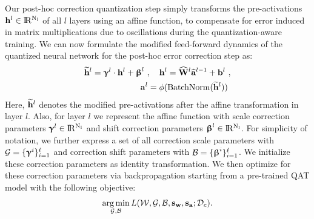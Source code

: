 Our post-hoc correction quantization step simply transforms the pre-activations ${\mathbf{h}}^l\in\rm I\!R^{N_l}$ of all $l$ layers using an affine function, to compensate for error induced in matrix multiplications due to oscillations during the quantization-aware training. We can now formulate the modified feed-forward dynamics of the quantized neural network for the post-hoc error correction step as:
\begin{align}
\label{eq:forward-qat-correction}
 \vect{h}^l = \bngamma^l \cdot \rvh^l  + \bnbeta^l\  ,\quad \rvh^l = \widehat\rmW^l\widehat\rva^{l-1} + \rvb^l\ , \\
 \rva^l = \phi(\BatchNorm(\vect{h}^l))\ 
\end{align}
Here, $\mathbf{\widetilde{h}}^l$ denotes the modified pre-activations after the affine transformation in layer $l$. Also, for layer $l$ we represent the affine function with scale correction parameters $\boldsymbol{\upgamma}^l\in\rm I\!R^{N_l}$ and shift correction parameters $\boldsymbol{\upbeta}^l\in\rm I\!R^{N_l}$. For simplicity of notation, we further express a set of all correction scale parameters with $\mathcal{G} = \{\boldsymbol{\upgamma}^i\}_{i=1}^\ell$ and correction shift parameters with $\mathcal{B} = \{\boldsymbol{\upbeta}^i\}_{i=1}^\ell$. We initialize these correction parameters as identity transformation. We then optimize for these correction parameters via backpropagation starting from a pre-trained QAT model with the following objective:
\begin{equation}\label{eq:qat-corr-nn}
\operatorname*{arg\,min}_{\mathcal{G},\mathcal{B}}L(\mathcal{W}, \mathcal{G}, \mathcal{B}, {\mathbf{s}}_{{\mathbf{w}}}, {\mathbf{s}}_{{\mathbf{a}}};\mathcal{D}_c).
\end{equation}
